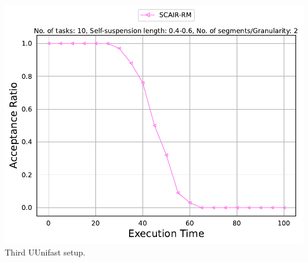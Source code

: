 \documentclass[]{article}
\begin{document}
\begin{minipage}[t]{0.48\linewidth}
            \includegraphics[width=\linewidth]{SCAIR-RM[2][0.4-0.6][10].pdf}
		Third UUnifast setup.
		\vspace{0.3cm}
		

		
	\end{minipage}\hfill
\end{document}

